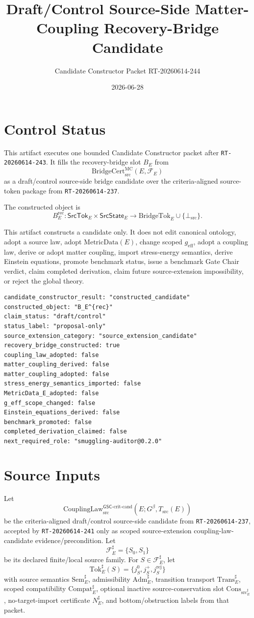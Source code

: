 \documentclass[11pt]{article}
\title{Draft/Control Source-Side Matter-Coupling Recovery-Bridge Candidate}
\author{Candidate Constructor Packet RT-20260614-244}
\date{2026-06-28}
\newcommand{\Gbeta}{G^\beta}
\newcommand{\geff}{g_{\mathrm{eff}}}
\newcommand{\MetricData}{\mathrm{MetricData}}
\newcommand{\CouplingLawCrit}{\mathrm{CouplingLaw}^{\mathsf{GSC}\mbox{-}\mathrm{crit}\mbox{-}\mathrm{cand}}_{\mathrm{src}}}
\newcommand{\BridgeCert}{\mathrm{BridgeCert}_{\mathrm{src}}^{\mathrm{MC}}}
\newcommand{\BottomSrc}{\bot_{\mathrm{src}}}
\newcommand{\Tok}{\mathrm{Tok}}
\newcommand{\Sem}{\mathrm{Sem}}
\newcommand{\Adm}{\mathrm{Adm}}
\newcommand{\Trans}{\mathrm{Trans}}
\newcommand{\Compat}{\mathrm{Compat}}
\newcommand{\ConsSrc}{\mathrm{Cons}_{\mathrm{src}}}
\newcommand{\BridgeTok}{\mathrm{BridgeTok}}
\begin{document}
\maketitle

\section{Control Status}

This artifact executes one bounded Candidate Constructor packet after
\texttt{RT-20260614-243}. It fills the recovery-bridge slot \(B_E\) from
\[
  \BridgeCert(E,\mathcal{F}_E)
\]
as a draft/control source-side bridge candidate over the criteria-aligned
source-token package from \texttt{RT-20260614-237}.

The constructed object is
\[
  B_E^{\mathrm{rec}}:
  \mathsf{SrcTok}_E \times \mathsf{SrcState}_E
  \longrightarrow
  \BridgeTok_E \cup \{\BottomSrc\}.
\]

This artifact constructs a candidate only. It does not edit canonical
ontology, adopt a source law, adopt \(\MetricData(E)\), change scoped
\(\geff\), adopt a coupling law, derive or adopt matter coupling, import
stress-energy semantics, derive Einstein equations, promote benchmark status,
issue a benchmark Gate Chair verdict, claim completed derivation, claim
future source-extension impossibility, or reject the global theory.

\begin{verbatim}
candidate_constructor_result: "constructed_candidate"
constructed_object: "B_E^{rec}"
claim_status: "draft/control"
status_label: "proposal-only"
source_extension_category: "source_extension_candidate"
recovery_bridge_constructed: true
coupling_law_adopted: false
matter_coupling_derived: false
matter_coupling_adopted: false
stress_energy_semantics_imported: false
MetricData_E_adopted: false
g_eff_scope_changed: false
Einstein_equations_derived: false
benchmark_promoted: false
completed_derivation_claimed: false
next_required_role: "smuggling-auditor@0.2.0"
\end{verbatim}

\section{Source Inputs}

Let
\[
  \CouplingLawCrit(E;\Gbeta,T_{\mathrm{src}}(E))
\]
be the criteria-aligned draft/control source-side candidate from
\texttt{RT-20260614-237}, accepted by \texttt{RT-20260614-241} only as scoped
source-extension coupling-law-candidate evidence/precondition. Let
\[
  \mathcal{F}_E^\sharp=\{S_0,S_1\}
\]
be its declared finite/local source family. For \(S\in\mathcal{F}_E^\sharp\),
let
\[
  \Tok_E^\sharp(S)=\{j_S^0,j_S^+,j_S^{\mathrm{rej}}\}
\]
with source semantics \(\Sem_E^\sharp\), admissibility
\(\Adm_E^\sharp\), transition transport \(\Trans_E^\sharp\), scoped
compatibility \(\Compat_E^\sharp\), optional inactive source-conservation
slot \(\ConsSrc_E^\sharp\), no-target-import certificate \(N_E^\sharp\), and
bottom/obstruction labels from that packet.
\end{document}

